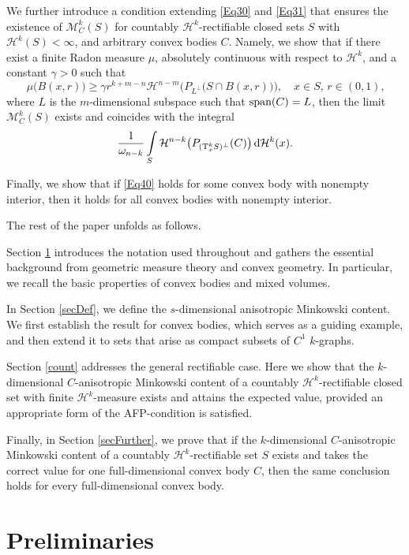 \documentclass[pdflatex,sn-mathphys-num]{sn-jnl}
\theoremstyle{plain}
\theoremstyle{definition}
\DeclareMathOperator{\LO}{\textup{span}}
\newcommand{\dH}[1]{\,\mathrm d\mathcal{H}^{#1}}
\begin{document}
We further introduce a condition extending \eqref{Eq30} and \eqref{Eq31} that ensures the existence of $\mathcal{M}^k_C(S)$ for countably $\mathcal{H}^k$-rectifiable closed sets $S$ with $\mathcal{H}^k(S)<\infty$, and arbitrary convex bodies $C$. Namely, we show that if there exist a finite Radon measure $\mu$, absolutely continuous with respect to $\mathcal{H}^k$, and a constant $\gamma>0$ such that $$\mu\big(B(x, r)\big)\geq\gamma r^{k+m-n}\mathcal{H}^{n-m}\Big(P_{L^{\perp}}\big(S\cap B(x, r)\big)\Big),\quad\text{$x\in S$, $r\in (0, 1)$,}$$ where $L$ is the $m$-dimensional subspace such that $\LO(C)=L$, then the limit $\mathcal{M}^k_C(S)$ exists and coincides with the integral $$\frac{1}{\omega_{n-k}}
\int\limits_S \mathcal{H}^{n-k}\big(P_{(\textup{T}^k_xS)^{\perp}}(C)\big)\dH{k}(x).$$

Finally, we show that if \eqref{Eq40} holds for some convex body with nonempty interior, then it holds for all convex bodies with nonempty interior.



\medskip

The rest of the paper unfolds as follows.

Section \ref{secPrelim} introduces the notation used throughout and gathers the essential background from geometric measure theory and convex geometry. In particular, we recall the basic properties of convex bodies and mixed volumes.

In Section \ref{secDef}, we define the $s$-dimensional anisotropic Minkowski content. We first establish the result for convex bodies, which serves as a guiding example, and then extend it to sets that arise as compact subsets of $C^{1}$ $k$-graphs.

Section \ref{count} addresses the general rectifiable case. Here we show that the $k$-dimensional $C$-anisotropic Minkowski content of a countably $\mathcal{H}^{k}$-rectifiable closed set with finite $\mathcal{H}^k$-measure exists and attains the expected value, provided an appropriate form of the AFP-condition is satisfied.

Finally, in Section \ref{secFurther}, we prove that if the $k$-dimensional $C$-anisotropic Minkowski content of a countably $\mathcal{H}^k$-rectifiable set $S$ exists and takes the correct value for one full-dimensional convex body $C$, then the same conclusion holds for every full-dimensional convex body.




\section{Preliminaries}
\label{secPrelim}
\end{document}

